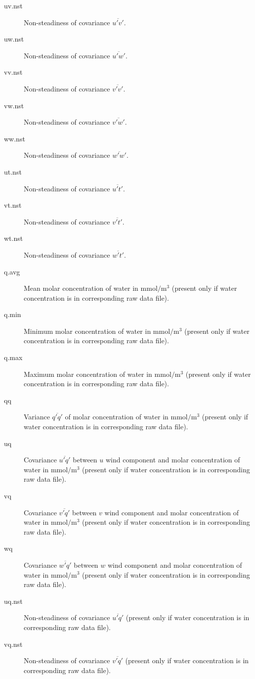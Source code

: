 \documentclass[a4paper,10pt]{book}
\begin{document}
\begin{description}
 \item[uv.nst] Non-steadiness of covariance $\overline{u'v'}$.
 \item[uw.nst] Non-steadiness of covariance $\overline{u'w'}$.
 \item[vv.nst] Non-steadiness of covariance $\overline{v'v'}$.
 \item[vw.nst] Non-steadiness of covariance $\overline{v'w'}$.
 \item[ww.nst] Non-steadiness of covariance $\overline{w'w'}$.
 \item[ut.nst] Non-steadiness of covariance $\overline{u't'}$.
 \item[vt.nst] Non-steadiness of covariance $\overline{v't'}$.
 \item[wt.nst] Non-steadiness of covariance $\overline{w't'}$.
 \item[q.avg] Mean molar concentration of water in $\mbox{mmol}/\mbox{m}^{3}$ (present only if water concentration is in corresponding raw data file).
 \item[q.min] Minimum molar concentration of water in $\mbox{mmol}/\mbox{m}^{3}$ (present only if water concentration is in corresponding raw data file).
 \item[q.max] Maximum molar concentration of water in $\mbox{mmol}/\mbox{m}^{3}$ (present only if water concentration is in corresponding raw data file).
 \item[qq] Variance $\overline{q'q'}$ of molar concentration of water in $\mbox{mmol}/\mbox{m}^{3}$ (present only if water concentration is in corresponding raw data file).
 \item[uq] Covariance $\overline{u'q'}$ between $u$ wind component and molar concentration of water in $\mbox{mmol}/\mbox{m}^{3}$ (present only if water concentration is in corresponding raw data file).
 \item[vq] Covariance $\overline{v'q'}$ between $v$ wind component and molar concentration of water in $\mbox{mmol}/\mbox{m}^{3}$ (present only if water concentration is in corresponding raw data file).
 \item[wq] Covariance $\overline{w'q'}$ between $w$ wind component and molar concentration of water in $\mbox{mmol}/\mbox{m}^{3}$ (present only if water concentration is in corresponding raw data file).
 \item[uq.nst] Non-steadiness of covariance $\overline{u'q'}$ (present only if water concentration is in corresponding raw data file).
 \item[vq.nst] Non-steadiness of covariance $\overline{v'q'}$ (present only if water concentration is in corresponding raw data file).

\end{description}
\end{document}
